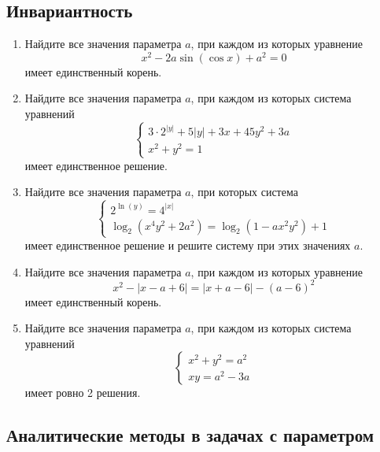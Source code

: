 \documentclass[12pt]{article}
\begin{document}
\subsection*{Инвариантность}
 \begin{enumerate}[start=1,label={\itshape\bfseries \arabic*.}]
    \item Найдите все значения параметра $a$, при каждом из которых уравнение $$x^2 - 2a\sin{(\cos{x})} + a^2 = 0$$
    имеет единственный корень.
    \item Найдите все значения параметра $a$, при каждом из которых система уравнений
    $$\begin{cases} 3 \cdot 2^{|y|} + 5|y| + 3x + 4 5y^2 + 3a \\ x^2 + y^2 = 1\end{cases}$$
    имеет единственное решение.
    \item Найдите все значения параметра $a$, при которых система
    $$ \begin{cases} 2^{\ln(y)} = 4^{|x|} \\ \log_{2}(x^4 y^2 + 2a^2) = \log_2(1 - ax^2y^2) + 1\end{cases}$$
    имеет единственное решение и решите систему при этих значениях $a$.
    \item Найдите все значения параметра $a$, при каждом из которых уравнение
    $$x^2 - |x - a + 6| = |x + a - 6| - (a - 6)^2$$
    имеет единственный корень.
    \item Найдите все значения параметра $a$, при каждом из которых система уравнений
    $$\begin{cases}
    x^2 + y^2 = a^2 \\
    xy = a^2 - 3a
    \end{cases}$$
    имеет ровно 2 решения.
\end{enumerate}









\subsection{Аналитические методы в задачах с параметром}
\end{document}
